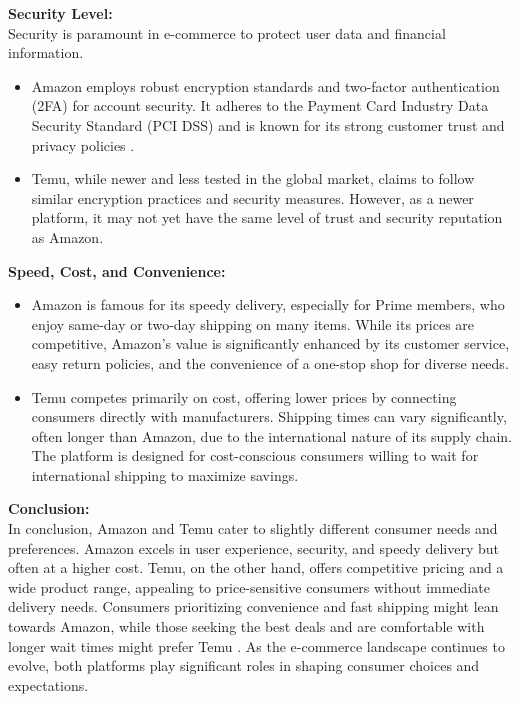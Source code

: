 \documentclass[12pt,a4paper]{article}
\begin{document}
\noindent\textbf{Security Level:}\\
\noindent Security is paramount in e-commerce to protect user data and financial information.
\begin{itemize}
    \item Amazon employs robust encryption standards and two-factor authentication (2FA) for account security. It adheres to the Payment Card Industry Data Security Standard (PCI DSS) and is known for its strong customer trust and privacy policies \citep{Ref4.2}.
    \item Temu, while newer and less tested in the global market, claims to follow similar encryption practices and security measures. However, as a newer platform, it may not yet have the same level of trust and security reputation as Amazon.
\end{itemize}

\noindent\textbf{Speed, Cost, and Convenience:}
\begin{itemize}
    \item Amazon is famous for its speedy delivery, especially for Prime members, who enjoy same-day or two-day shipping on many items. While its prices are competitive, Amazon’s value is significantly enhanced by its customer service, easy return policies, and the convenience of a one-stop shop for diverse needs.
    \item Temu competes primarily on cost, offering lower prices by connecting consumers directly with manufacturers. Shipping times can vary significantly, often longer than Amazon, due to the international nature of its supply chain. The platform is designed for cost-conscious consumers willing to wait for international shipping to maximize savings.
\end{itemize}

\noindent\textbf{Conclusion: }\\
\noindent In conclusion, Amazon and Temu cater to slightly different consumer needs and preferences. Amazon excels in user experience, security, and speedy delivery but often at a higher cost. Temu, on the other hand, offers competitive pricing and a wide product range, appealing to price-sensitive consumers without immediate delivery needs. Consumers prioritizing convenience and fast shipping might lean towards Amazon, while those seeking the best deals and are comfortable with longer wait times might prefer Temu \citep{Ref4.3}. As the e-commerce landscape continues to evolve, both platforms play significant roles in shaping consumer choices and expectations. 
\end{document}
